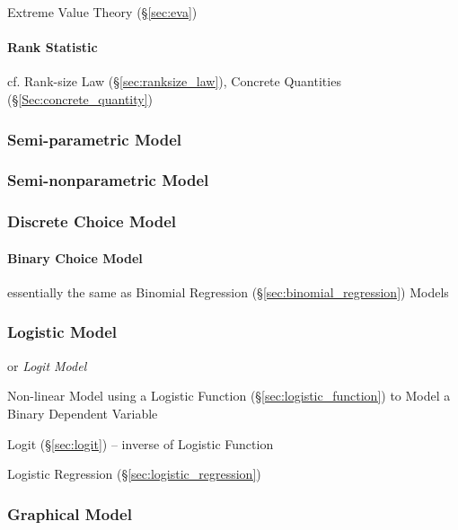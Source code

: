 Extreme Value Theory (\S\ref{sec:eva})



\paragraph{Rank Statistic}\label{sec:rank_statistic}\hfill

cf. Rank-size Law (\S\ref{sec:ranksize_law}), Concrete Quantities
(\S\ref{Sec:concrete_quantity})



\subsubsection{Semi-parametric Model}\label{sec:semiparametric_model}

\subsubsection{Semi-nonparametric Model}\label{sec:seminonparametric_model}

\subsubsection{Discrete Choice Model}\label{sec:discrete_choice_model}

\paragraph{Binary Choice Model}\label{sec:binary_choice}\hfill

essentially the same as Binomial Regression
(\S\ref{sec:binomial_regression}) Models



\subsubsection{Logistic Model}\label{sec:logistic_model}

or \emph{Logit Model}

Non-linear Model using a Logistic Function (\S\ref{sec:logistic_function}) to
Model a Binary Dependent Variable

Logit (\S\ref{sec:logit}) -- inverse of Logistic Function

Logistic Regression (\S\ref{sec:logistic_regression})



\subsubsection{Graphical Model}\label{sec:graphical_model}

